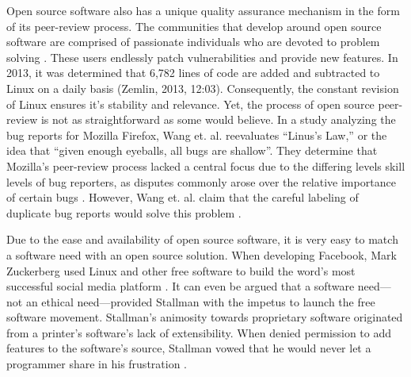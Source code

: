 Open source software also has a unique quality assurance mechanism in the form of its peer-review process. The communities that develop around open source software are comprised of passionate individuals who are devoted to problem solving \cite[p. 19]{bisson}. These users endlessly patch vulnerabilities and provide new features. In 2013, it was determined that 6,782 lines of code are added and subtracted to Linux on a daily basis (Zemlin, 2013, 12:03). Consequently, the  constant revision of Linux ensures it's stability and relevance. Yet, the process of open source peer-review is not as straightforward as some would believe. In a study analyzing the bug reports for Mozilla Firefox, Wang et. al. reevaluates “Linus's Law,” or the idea that “given enough eyeballs, all bugs are shallow”\cite[p. 52]{wang}.  They determine that Mozilla's peer-review process lacked a central focus due to the differing levels skill levels of bug reporters, as disputes commonly arose over the relative importance of certain bugs \citeyear[p. 52]{wang}. However, Wang et. al.  claim that the careful labeling of duplicate bug reports would solve this problem \citeyear[p. 52]{wang}. 

Due to the ease and availability of open source software, it is very easy to match a software need with an open source solution. When developing Facebook, Mark Zuckerberg used Linux and other free software to build the word's most successful social media platform \cite[6:18]{zemlin}. It can even be argued that a software need—not an ethical need—provided Stallman with the impetus to launch the free software movement. Stallman's animosity towards proprietary software originated from a printer's software's lack of extensibility. When denied permission to add features to the software's source, Stallman vowed that he would never let a programmer share in his frustration \citeyear[para. 19]{rms2015}.  
	
	
	
	
